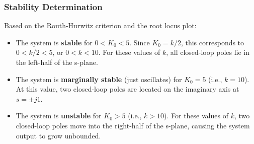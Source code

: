 \documentclass{article}
\begin{document}
	\subsubsection*{Stability Determination}
	Based on the Routh-Hurwitz criterion and the root locus plot:
	\begin{itemize}
		\item The system is \textbf{stable} for $0 < K_0 < 5$.
		Since $K_0 = k/2$, this corresponds to $0 < k/2 < 5$, or $0 < k < 10$.
		For these values of $k$, all closed-loop poles lie in the left-half of the s-plane.
		\item The system is \textbf{marginally stable} (just oscillates) for $K_0 = 5$ (i.e., $k=10$).
		At this value, two closed-loop poles are located on the imaginary axis at $s = \pm j1$.
		\item The system is \textbf{unstable} for $K_0 > 5$ (i.e., $k > 10$).
		For these values of $k$, two closed-loop poles move into the right-half of the s-plane, causing the system output to grow unbounded.
	\end{itemize}
	
\end{document}
